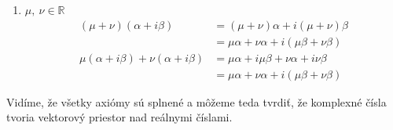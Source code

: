 \documentclass[a4paper, 10pt, ]{article}
\begin{document}
\begin{example}
\begin{enumerate}
        \item $\mu, \ \nu \in \mathbb{R}$
        \begin{align*}
            (\mu + \nu) (\alpha + i \beta) &= 
            (\mu + \nu) \alpha + i (\mu + \nu) \beta \\ &=
            \mu \alpha + \nu \alpha + i (\mu \beta + \nu \beta) \\
            \mu (\alpha + i \beta) + \nu (\alpha + i \beta) &= 
            \mu \alpha + i \mu \beta + \nu \alpha + i \nu \beta \\ &=
            \mu \alpha + \nu \alpha + i (\mu \beta + \nu \beta)  
        \end{align*}
    \end{enumerate}
    Vidíme, že všetky axiómy sú splnené a môžeme teda tvrdiť, že komplexné čísla tvoria vektorový priestor nad reálnymi číslami.
\end{example}
\end{document}
